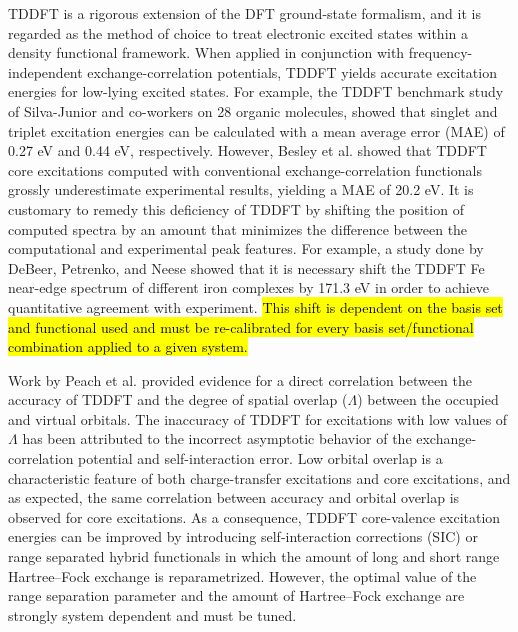 \documentclass[12pt]{article}
\begin{document}
TDDFT is a rigorous extension of the DFT ground-state formalism,\cite{runge_density-functional_1984} and it is regarded as the method of choice to treat electronic excited states within a density functional framework.
 When applied in conjunction with frequency-independent exchange-correlation potentials, TDDFT yields accurate excitation energies for low-lying excited states. For example, the TDDFT benchmark study of Silva-Junior and co-workers\cite{silva-junior_benchmarks_2008} on 28 organic molecules, showed that singlet and triplet excitation energies can be calculated with a mean average error (MAE) of 0.27 eV and 0.44 eV, respectively. However, Besley et al.\cite{besley_self-consistent-field_2009} showed that TDDFT core excitations computed with conventional exchange-correlation functionals grossly underestimate experimental results, yielding a MAE of 20.2 eV. It is customary to remedy this deficiency of TDDFT by shifting the position of computed spectra by an amount that minimizes the difference between the computational and experimental peak features. For example, a study done by DeBeer, Petrenko, and Neese\cite{debeer_george_prediction_2008} showed that it is necessary shift the TDDFT Fe near-edge spectrum of different iron complexes by 171.3 eV in order to achieve quantitative agreement with experiment. \hl{This shift is dependent on the basis set and functional used and must be re-calibrated for every basis set/functional combination applied to a given system.}

Work by Peach et al.\cite{peach_excitation_2008} provided evidence for a direct correlation between the accuracy of TDDFT and the degree of spatial overlap ($\Lambda$) between the occupied and virtual orbitals.
The inaccuracy of TDDFT for excitations with low values of $\Lambda$ has been attributed to the incorrect asymptotic behavior of the exchange-correlation potential and self-interaction error.\cite{peach_excitation_2008} Low orbital overlap is a characteristic feature of both charge-transfer excitations and core excitations, and as expected, the same correlation between accuracy and orbital overlap is observed for core excitations.\cite{besley_time-dependent_2009}
As a consequence, TDDFT core-valence excitation energies can be improved by introducing self-interaction corrections (SIC)\cite{tu_core_2007} or range separated hybrid functionals in which the amount of long and short range Hartree--Fock exchange is reparametrized.\cite{besley_time-dependent_2009, nakata_time-dependent_2006}  However, the optimal value of the range separation parameter and the amount of Hartree--Fock exchange are strongly system dependent and must be tuned.\cite{capano_role_2013,besley_time-dependent_2007,besley_time-dependent_2010}
\end{document}

